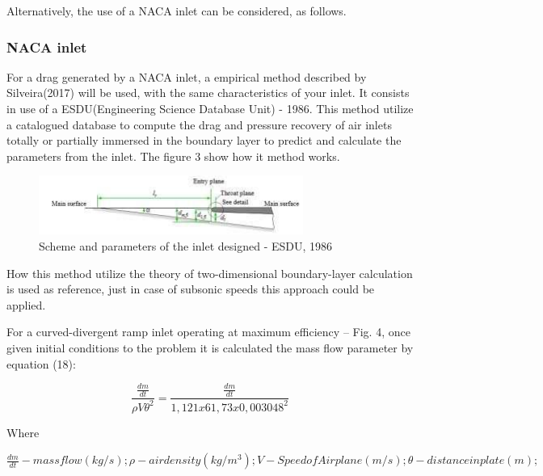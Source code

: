 

Alternatively, the use of a NACA inlet can be considered, as follows.

\subsubsection{NACA inlet}
For a drag generated by a NACA inlet, a empirical method described by Silveira(2017) will be used, with the same characteristics of your inlet. It consists in use of a ESDU(Engineering Science Database Unit) - 1986. This method utilize a catalogued database to compute the drag and pressure recovery of air inlets totally or partially immersed in the boundary layer to predict and calculate the parameters from the inlet. The figure 3 show how it method works.

\begin{figure}
     \centering
     \includegraphics{fig/ESDU.png}
     \caption{Scheme and parameters of the inlet designed - ESDU, 1986}
     \label{fig:conduction}
 \end{figure}

How this method utilize the theory of two-dimensional boundary-layer calculation is used as reference, just in case of subsonic speeds this approach could be applied. 

For a curved-divergent ramp inlet operating at maximum efficiency – Fig. 4, once given initial conditions to the problem it is calculated the mass flow parameter by
equation (18):

\begin{equation}
     \frac{\frac{dm}{dt}}{ \rho V \theta^2 } = \dfrac{\frac{dm}{dt}}{1,121x61,73x0,003048^2}
\end{equation}


Where


\begin{math}
\frac{dm}{dt} - mass flow (kg/s);

{\rho} - air density (kg/m^3);

V - Speed of Airplane (m/s);

\theta - distance in plate (m);

\end{math}


